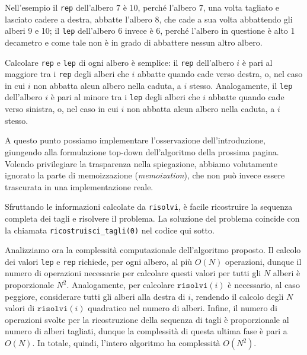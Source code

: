 Nell'esempio il \texttt{rep} dell'albero 7 è 10, perché l'albero 7, una volta tagliato e lasciato cadere a destra, abbatte l'albero 8, che cade a sua volta abbattendo gli alberi 9 e 10; il \texttt{lep} dell'albero 6 invece è 6, perché l'albero in questione è alto 1 decametro e come tale non è in grado di abbattere nessun altro albero.

Calcolare \texttt{rep} e \texttt{lep} di ogni albero è semplice: il \texttt{rep} dell'albero $i$ è pari al maggiore tra i \texttt{rep} degli alberi che $i$ abbatte quando cade verso destra, o, nel caso in cui $i$ non abbatta alcun albero nella caduta, a $i$ stesso. Analogamente, il \texttt{lep} dell'albero $i$ è pari al minore tra i \texttt{lep} degli alberi che $i$ abbatte quando cade verso sinistra, o, nel caso in cui $i$ non abbatta alcun albero nella caduta, a $i$ stesso.

\begin{minipage}{.49\textwidth}
	\colorbox{white}{}
\end{minipage}
\hfill
\begin{minipage}{.49\textwidth}
	\colorbox{white}{}
\end{minipage}

A questo punto possiamo implementare l'osservazione dell'introduzione, giungendo alla formulazione top-down dell'algoritmo della prossima pagina. Volendo privilegiare la trasparenza nella spiegazione, abbiamo volutamente ignorato la parte di memoizzazione (\emph{memoization}), che non può invece essere trascurata in una implementazione reale.

\colorbox{white}{}

Sfruttando le informazioni calcolate da \texttt{risolvi}, è facile ricostruire la sequenza completa dei tagli e risolvere il problema. La soluzione del problema coincide con la chiamata \verb|ricostruisci_tagli(0)| nel codice qui sotto.

\colorbox{white}{}

Analizziamo ora la complessità computazionale dell'algoritmo proposto. Il calcolo dei valori \texttt{lep} e \texttt{rep} richiede, per ogni albero, al più $O(N)$ operazioni, dunque il numero di operazioni necessarie per calcolare questi valori per tutti gli $N$ alberi è proporzionale $N^2$. Analogamente, per calcolare $\texttt{risolvi}(i)$ è necessario, al caso peggiore, considerare tutti gli alberi alla destra di $i$, rendendo il calcolo degli $N$ valori di $\texttt{risolvi}(i)$ quadratico nel numero di alberi. Infine, il numero di operazioni svolte per la ricostruzione della sequenza di tagli è proporzionale al numero di alberi tagliati, dunque la complessità di questa ultima fase è pari a $O(N)$. In totale, quindi, l'intero algoritmo ha complessità $O(N^2)$.

